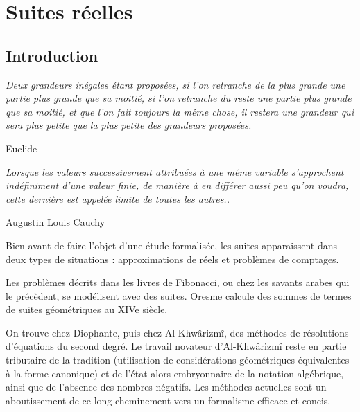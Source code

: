 
\section[Suites réelles]{Suites réelles}

\subsection{Introduction}

\begin{flushleft}
	\textit{Deux grandeurs inégales étant proposées, si l’on retranche de la plus grande une partie plus grande que sa moitié, si l’on retranche du reste une partie plus grande que sa moitié, et que l’on fait toujours la même chose, il restera une grandeur qui sera plus petite que la plus petite des grandeurs proposées.}
\end{flushleft}
\begin{flushright}
	Euclide
\end{flushright}

\begin{flushleft}
	\textit{Lorsque les valeurs successivement attribuées à une même variable s’approchent indéfiniment d’une valeur finie, de manière à en différer aussi peu qu’on voudra, cette dernière est appelée limite de toutes les autres..}
\end{flushleft}
\begin{flushright}
	Augustin Louis Cauchy
\end{flushright}
Bien avant de faire l’objet d'une étude formalisée, les suites apparaissent dans deux types
de situations : approximations de réels et problèmes de comptages. 


Les problèmes décrits dans les livres de Fibonacci, ou chez les savants arabes qui le
précèdent, se modélisent avec des suites. Oresme calcule des sommes de termes de suites
géométriques au XIVe siècle.


On trouve chez Diophante, puis chez Al-Khwârizmî, des méthodes de résolutions
d’équations du second degré. Le travail novateur d’Al-Khwârizmî reste en partie tributaire de
la tradition (utilisation de considérations géométriques équivalentes à la forme canonique) et
de l'état alors embryonnaire de la notation algébrique, ainsi que de l’absence des nombres
négatifs. Les méthodes actuelles sont un aboutissement de ce long cheminement vers un
formalisme efficace et concis.


